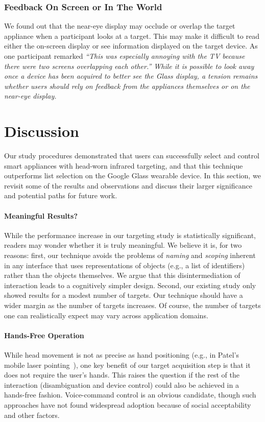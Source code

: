 \documentclass{sigchi}
\newcommand {\studyquote}[1]{\em ``#1''\normalfont}
\begin{document}
\subsubsection{Feedback On Screen or In The World}
We found out that the near-eye display may occlude or overlap the target appliance when a participant looks at a target. This may make it difficult to read either the on-screen display or see information displayed on the target device.  As one participant remarked \studyquote{This was especially annoying with the TV because there were two screens overlapping each other.} While it is possible to look away once a device has been acquired to better see the Glass display, a tension remains whether users should rely on feedback from the appliances themselves or on the near-eye display.


\section{Discussion}
Our study procedures demonstrated that users can successfully select and control smart appliances with head-worn infrared targeting, and that this technique outperforms list selection on the Google Glass wearable device. In this section, we revisit some of the results and observations and discuss their larger significance and potential paths for future work.

\paragraph{Meaningful Results?}
While the performance increase in our targeting study is statistically significant, readers may wonder whether it is truly meaningful. We believe it is, for two reasons: first, our technique avoids the problems of {\em naming} and {\em scoping} inherent in any interface that uses representations of objects (e.g., a list of identifiers) rather than the objects themselves. We argue that this disintermediation of interaction leads to a cognitively simpler design. Second, our existing study only showed results for a modest number of targets. Our technique should have a wider margin as the number of targets increases. Of course, the number of targets one can realistically expect may vary across application domains.

\paragraph{Hands-Free Operation}
While head movement is not as precise as hand positioning (e.g., in Patel's mobile laser pointing~\cite{patel_2-way_2003}), one key benefit of our target acquisition step is that it does not require the user's hands. This raises the question if the rest of the interaction (disambiguation and device control) could also be achieved in a hands-free fashion. Voice-command control is an obvious candidate, though such approaches have not found widespread adoption because of social acceptability and other factors.
\end{document}
